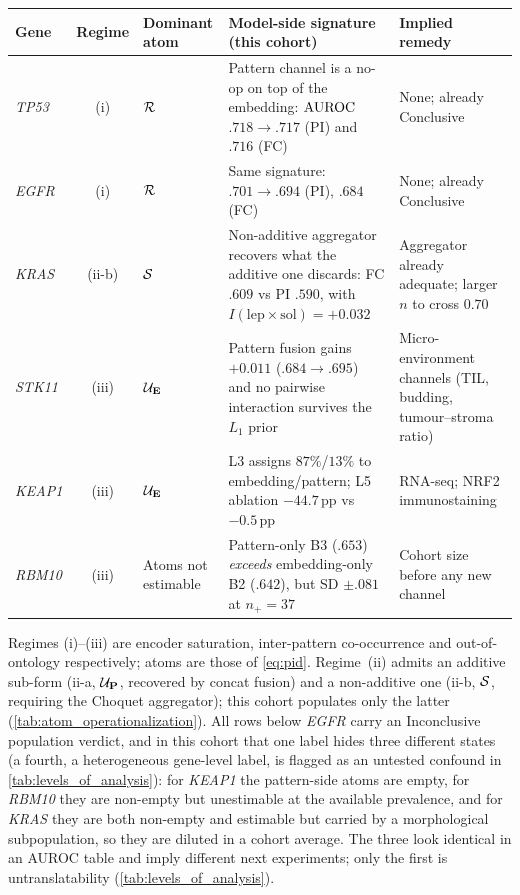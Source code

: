 \footnotesize
\setlength{\tabcolsep}{4pt}
\renewcommand{\arraystretch}{1.15}
\begin{tabularx}{\linewidth}{l c l X X}
\toprule
\textbf{Gene} & \textbf{Regime} & \textbf{Dominant atom} &
  \textbf{Model-side signature (this cohort)} &
  \textbf{Implied remedy} \\
\midrule
\textit{TP53}  & (i)   & $\mathcal{R}$
  & Pattern channel is a no-op on top of the embedding:
    $\text{AUROC}$ $.718\!\to\!.717$ (PI) and $.716$ (FC)
  & None; already Conclusive \\
\textit{EGFR}  & (i)   & $\mathcal{R}$
  & Same signature: $.701\!\to\!.694$ (PI), $.684$ (FC)
  & None; already Conclusive \\
\midrule
\textit{KRAS}  & (ii-b) & $\mathcal{S}$
  & Non-additive aggregator recovers what the additive one discards:
    FC $.609$ vs PI $.590$, with
    $I(\text{lep}\!\times\!\text{sol})={+}0.032$
  & Aggregator already adequate; larger $n$ to cross $0.70$ \\
\midrule
\textit{STK11} & (iii) & $\mathcal{U}_{\mathbf{E}}$
  & Pattern fusion gains $+0.011$ ($.684\!\to\!.695$) and no
    pairwise interaction survives the $L_1$ prior
  & Micro-environment channels (TIL, budding, tumour--stroma ratio) \\
\textit{KEAP1} & (iii) & $\mathcal{U}_{\mathbf{E}}$
  & L3 assigns $87\%$/$13\%$ to embedding/pattern; L5 ablation
    $-44.7$\,pp vs $-0.5$\,pp
  & RNA-seq; NRF2 immunostaining \\
\textit{RBM10} & (iii) & Atoms not estimable
  & Pattern-only B3 ($.653$) \emph{exceeds} embedding-only B2
    ($.642$), but SD $\pm.081$ at $n_+\!=\!37$
  & Cohort size before any new channel \\
\bottomrule
\end{tabularx}
\begin{flushleft}\footnotesize
Regimes (i)--(iii) are encoder saturation, inter-pattern
co-occurrence and out-of-ontology respectively;
atoms are those of \cref{eq:pid}.
Regime~(ii) admits an additive sub-form (ii-a, $\mathcal{U}_{\mathbf{P}}$,
recovered by concat fusion) and a non-additive one
(ii-b, $\mathcal{S}$, requiring the Choquet aggregator);
this cohort populates only the latter
(\cref{tab:atom_operationalization}).
All rows below \textit{EGFR} carry an Inconclusive population
verdict, and in this cohort that one label hides three different
states (a fourth, a heterogeneous gene-level label, is flagged as an
untested confound in \cref{tab:levels_of_analysis}): for
\textit{KEAP1} the pattern-side atoms are empty, for \textit{RBM10}
they are non-empty but unestimable at the available prevalence, and
for \textit{KRAS} they are both non-empty and estimable but carried
by a morphological subpopulation, so they are diluted in a cohort
average.
The three look identical in an AUROC table and imply different next
experiments; only the first is untranslatability
(\cref{tab:levels_of_analysis}).
\end{flushleft}
